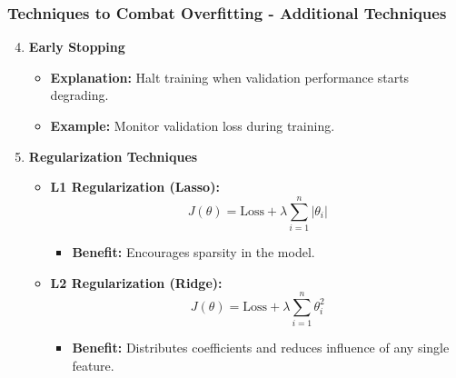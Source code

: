 \documentclass[aspectratio=169]{beamer}
\begin{document}
\begin{frame}[fragile]
    \frametitle{Techniques to Combat Overfitting - Additional Techniques}
    \begin{enumerate}
        \setcounter{enumi}{3}
        \item \textbf{Early Stopping}
            \begin{itemize}
                \item \textbf{Explanation:} Halt training when validation performance starts degrading.
                \item \textbf{Example:} Monitor validation loss during training.
            \end{itemize}

        \item \textbf{Regularization Techniques}
            \begin{itemize}
                \item \textbf{L1 Regularization (Lasso):}
                    \begin{equation}
                    J(\theta) = \text{Loss} + \lambda \sum_{i=1}^{n} |\theta_i|
                    \end{equation}
                    \begin{itemize}
                        \item \textbf{Benefit:} Encourages sparsity in the model.
                    \end{itemize}
                
                \item \textbf{L2 Regularization (Ridge):}
                    \begin{equation}
                    J(\theta) = \text{Loss} + \lambda \sum_{i=1}^{n} \theta_i^2
                    \end{equation}
                    \begin{itemize}
                        \item \textbf{Benefit:} Distributes coefficients and reduces influence of any single feature.
                    \end{itemize}
            \end{itemize}
    \end{enumerate}
\end{frame}
\end{document}
